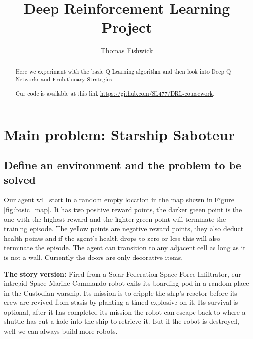 \documentclass[a4pape, 11pt, english]{article}
\begin{document}
\title{Deep Reinforcement Learning Project}
\author{Thomas Fishwick}
\date{} %
\maketitle

\begin{abstract}
Here we experiment with the basic Q Learning algorithm and then look into Deep Q Networks and Evolutionary Strategies

Our code is available at this link \url{https://github.com/SL477/DRL-coursework}.
\end{abstract}

\section{Main problem: Starship Saboteur}
\subsection{Define an environment and the problem to be solved}


Our agent will start in a random empty location in the map shown in Figure \ref{fig:basic_map}. It has two positive reward points, the darker green point is the one with the highest reward and the lighter green point will terminate the training episode. The yellow points are negative reward points, they also deduct health points and if the agent's health drops to zero or less this will also terminate the episode. The agent can transition to any adjacent cell as long as it is not a wall. Currently the doors are only decorative items.

\textbf{The story version:}
Fired from a Solar Federation Space Force Infiltrator, our intrepid Space Marine Commando robot exits its boarding pod in a random place in the Custodian warship. Its mission is to cripple the ship's reactor before its crew are revived from stasis by planting a timed explosive on it. Its survival is optional, after it has completed its mission the robot can escape back to where a shuttle has cut a hole into the ship to retrieve it. But if the robot is destroyed, well we can always build more robots.
\end{document}
